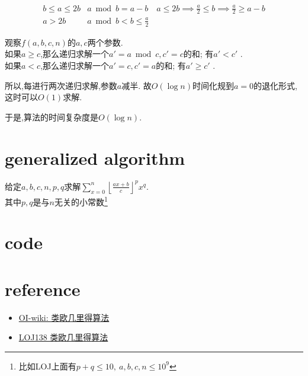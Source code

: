 \documentclass{article}
\begin{document}
\[
\begin{array}{c|l}
	b\leq a\leq 2b & a\bmod b=a-b\quad a\leq 2b\implies \frac{a}{2}\leq b\implies \frac{a}{2}\geq a-b\\
	a > 2b & a\bmod b < b \leq \frac{a}{2}
\end{array}
\]


观察$f(a,b,c,n)$的$a,c$两个参数.\\
如果$a\geq c$,那么递归求解一个$a'=a\bmod c,c'=c$的和; 有$a' < c'$ .\\
如果$a<    c$,那么递归求解一个$a'=c,c'=a$的和; 有$a' \geq c'$ .\par
所以,每进行两次递归求解,参数$a$减半. 故$O(\log n)$时间化规到$a=0$的退化形式,这时可以$O(1)$求解.\par
于是,算法的时间复杂度是$O(\log n)$.

\section{generalized algorithm}

\noindent 给定$a,b,c,n,p,q$求解$\displaystyle \sum_{x=0}^n
{\left\lfloor\frac{ax+b}{c}\right\rfloor}^{p}
x^q$.\\
其中$p,q$是与$n$无关的小常数\footnote{比如LOJ上面有$p+q\leq 10,\ a,b,c,n\leq 10^9$}

\noindent 


\newpage
\appendix

\section{code}

\section{reference}

\begin{itemize}
	\item \href{https://oi-wiki.org/math/euclidean/}{OI-wiki: 类欧几里得算法}
	\item \href{https://loj.ac/p/138}{LOJ138 类欧几里得算法}
\end{itemize}
\end{document}
